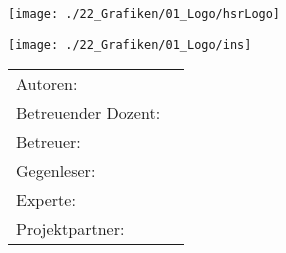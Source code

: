 %
%


%



\begin{titlepage}
\begin{center}
\begin{minipage}[t]{0.45\textwidth}
    \texttt{[image: ./22\_Grafiken/01\_Logo/hsrLogo]}
\end{minipage}
\hspace{\fill} %
\begin{minipage}[t]{0.45\textwidth}
    \vspace{-2.9cm}
    \texttt{[image: ./22\_Grafiken/01\_Logo/ins]} %
\end{minipage}

\end{center}

\vspace{15ex} %
\begin{center}
	\Huge 
	\begin{framed}
		\textbf{\titel}
	\end{framed}
	
	\vspace{3ex}
	\textbf{\arbeit}
	
	\vspace{1ex}
	\LARGE 
	\place
	
	\vspace{5ex}
	\begin{framed}
		\timeperiod
	\end{framed}
\end{center}

\vspace{11ex}
\begin{tabular}{ll} %
	Autoren:         		& \authors	\\
	Betreuender Dozent:		& \advisorprof  	\\
	Betreuer:        		& \advisor    	\\
	Gegenleser:      		& \contraprof  	\\
	Experte:      			& \expert  		\\
	Projektpartner:      	& \ins  		\\
\end{tabular}

\end{titlepage}

\restoregeometry %
%
